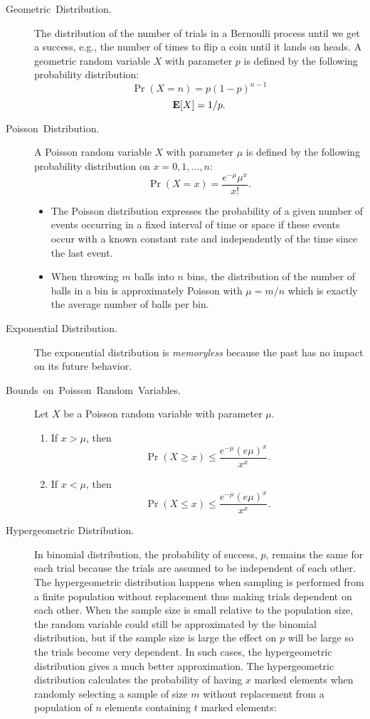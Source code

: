 \documentclass[11pt]{article}
\theoremstyle{mytheoremstyle}
\begin{document}
\begin{description}
	\item [{Geometric~Distribution.}] The distribution of the number of trials
	in a Bernoulli process until we get a success, e.g., the number of
	times to flip a coin until it lands on heads. A geometric random variable
	$X$ with parameter $p$ is defined by the following probability distribution:
	\[
	\Pr(X=n)=p(1-p)^{n-1}
	\]
	\[
	\mathrm{\mathbf{E}}[X]=1/p.
	\]
	\item [{Poisson~Distribution.}] A Poisson random variable $X$ with parameter
	$\mu$ is defined by the following probability distribution on $x=0,1,...,n$:
	\[
	\Pr(X=x)=\frac{e^{-\mu}\mu^{x}}{x!}.
	\]
	\begin{itemize}
		\item The Poisson distribution expresses the probability of a given number of events occurring in a fixed interval of time or space if these events occur with a known constant rate and independently of the time since the last event.
		
		\item When throwing $m$ balls into $n$ bins, the distribution of the number
		of balls in a bin is approximately Poisson with $\mu=m/n$ which is
		exactly the average number of balls per bin.
	\end{itemize}
	
	\item [Exponential Distribution.]
	The exponential distribution is \emph{memoryless} because the past has no impact on its future behavior.
	
	\item [{Bounds~on~Poisson~Random~Variables.}] Let $X$ be a Poisson random variable with parameter $\mu$.
	
	\begin{enumerate}
		\item If $x>\mu$, then 
		\[
		\Pr(X\geq x)\leq\frac{e^{-\mu}(e\mu)^{x}}{x^{x}}.
		\]
		\item If $x<\mu$, then
		\[
		\Pr(X\leq x)\leq\frac{e^{-\mu}(e\mu)^{x}}{x^{x}}.
		\]
	\end{enumerate}

	\item[Hypergeometric Distribution.]
	In binomial distribution, the probability of success, $p$, remains the same for each trial because the trials are assumed to be independent of each other. The hypergeometric distribution happens when sampling is performed from a finite population without replacement thus making trials dependent on each other. When the sample size is small relative to the population size, the random variable could still be approximated by the binomial distribution, but if the sample size is large the effect on $p$ will be large so the trials become very dependent. In such cases, the hypergeometric distribution gives a much better approximation. The hypergeometric distribution calculates the probability of having $x$ marked elements when randomly selecting a sample of size $m$ without replacement from a population of $n$ elements containing $t$ marked elements:
	

\end{description}
\end{document}
